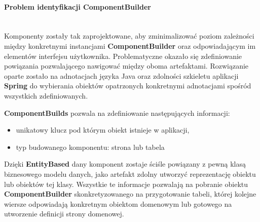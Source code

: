 	\paragraph{Problem identyfikacji \textbf{ComponentBuilder}} \hspace{0pt} \\
	Komponenty zostały tak zaprojektowane, aby zminimalizować poziom zależności między konkretnymi instancjami \textbf{ComponentBuilder} oraz odpowiadającym im elementów interfejsu użytkownika. Problematyczne okazało się zdefiniowanie powiązania pozwalającego nawigować między oboma artefaktami. Rozwiązanie oparte zostało na adnotacjach języka Java oraz zdolności szkieletu aplikacji \textbf{Spring} do wybierania obiektów opatrzonych konkretnymi adnotacjami spośród wszystkich zdefiniowanych.  
	
	\textbf{ComponentBuilds} pozwala na zdefiniowanie następujących informacji:
	\begin{itemize}
		\item unikatowy klucz pod którym obiekt istnieje w aplikacji,
		\item typ budowanego komponentu: strona lub tabela
	\end{itemize}
	Dzięki \textbf{EntityBased} dany komponent zostaje ściśle powiązany z pewną klasą biznesowego modelu danych, jako artefakt zdolny utworzyć reprezentację obiektu lub obiektów tej klasy. Wszystkie te informacje pozwalają na pobranie obiektu \textbf{ComponentBuilder} skonkretyzowanego na przygotowanie tabeli, której kolejne wiersze odpowiadają konkretnym obiektom domenowym lub gotowego na utworzenie definicji strony domenowej.  

